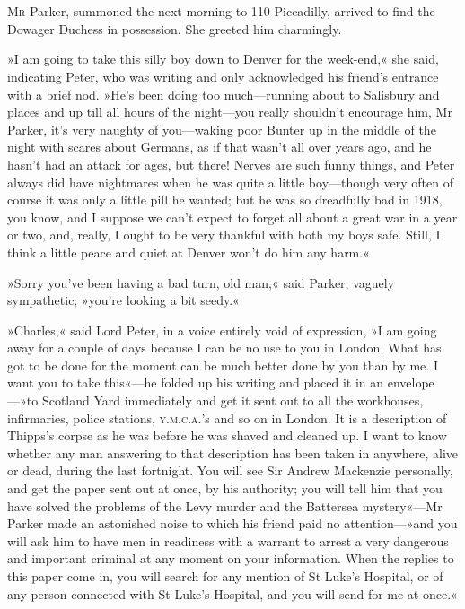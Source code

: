 \chapter[Chapter \thechapter]{}
\lettrine[lines=4]{M}{r} Parker, summoned the next morning to 110 Piccadilly, arrived to find the Dowager Duchess in possession. She greeted him charmingly.

\zz
»I am going to take this silly boy down to Denver for the week-end,« she said, indicating Peter, who was writing and only acknowledged his friend's entrance with a brief nod. »He's been doing too much\allowbreak---\allowbreak running about to Salisbury and places and up till all hours of the night\allowbreak---\allowbreak you really shouldn't encourage him, Mr Parker, it's very naughty of you\allowbreak---\allowbreak waking poor Bunter up in the middle of the night with scares about Germans, as if that wasn't all over years ago, and he hasn't had an attack for ages, but there! Nerves are such funny things, and Peter always did have nightmares when he was quite a little boy\allowbreak---\allowbreak though very often of course it was only a little pill he wanted; but he was so dreadfully bad in 1918, you know, and I suppose we can't expect to forget all about a great war in a year or two, and, really, I ought to be very thankful with both my boys safe. Still, I think a little peace and quiet at Denver won't do him any harm.«

»Sorry you've been having a bad turn, old man,« said Parker, vaguely sympathetic; »you're looking a bit seedy.«

»Charles,« said Lord Peter, in a voice entirely void of expression, »I am going away for a couple of days because I can be no use to you in London. What has got to be done for the moment can be much better done by you than by me. I want you to take this«---he folded up his writing and placed it in an envelope---»to Scotland Yard immediately and get it sent out to all the workhouses, infirmaries, police stations, \textsc{y.m.c.a.}'s and so on in London. It is a description of Thipps's corpse as he was before he was shaved and cleaned up. I want to know whether any man answering to that description has been taken in anywhere, alive or dead, during the last fortnight. You will see Sir Andrew Mackenzie personally, and get the paper sent out at once, by his authority; you will tell him that you have solved the problems of the Levy murder and the Battersea mystery«---Mr Parker made an astonished noise to which his friend paid no attention---»and you will ask him to have men in readiness with a warrant to arrest a very dangerous and important criminal at any moment on your information. When the replies to this paper come in, you will search for any mention of St Luke's Hospital, or of any person connected with St Luke's Hospital, and you will send for me at once.«

